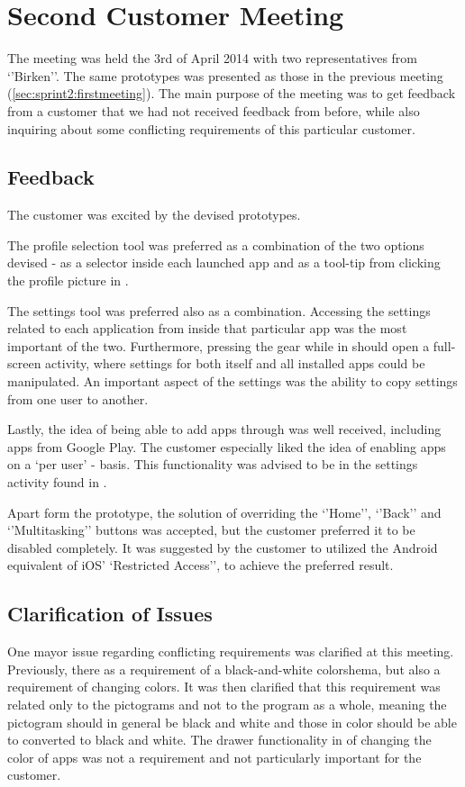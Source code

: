 \section{Second Customer Meeting}\label{sec:sprint2:secondmeeting}

The meeting was held the 3rd of April 2014 with two representatives from `'Birken''.
The same prototypes was presented as those in the previous meeting (\cref{sec:sprint2:firstmeeting}).
The main purpose of the meeting was to get feedback from a customer that we had not received feedback from before, while also inquiring about some conflicting requirements of this particular customer.

\subsection{Feedback}
The customer was excited by the devised prototypes.

The profile selection tool was preferred as a combination of the two options devised - as a selector inside each launched app and as a tool-tip from clicking the profile picture in \launcher.

The settings tool was preferred also as a combination.
Accessing the settings related to each application from inside that particular app was the most important of the two.
Furthermore, pressing the gear while in \launcher should open a full-screen activity, where settings for both \launcher itself and all installed apps could be manipulated.
An important aspect of the settings was the ability to copy settings from one user to another.

Lastly, the idea of being able to add apps through \launcher was well received, including apps from Google Play.
The customer especially liked the idea of enabling apps on a `per user' - basis.
This functionality was advised to be in the settings activity found in \launcher.

Apart form the prototype, the solution of overriding the `'Home'', `'Back'' and `'Multitasking'' buttons was accepted, but the customer preferred it to be disabled completely.
It was suggested by the customer to utilized the Android equivalent of iOS' `Restricted Access'', to achieve the preferred result.

\subsection{Clarification of Issues}
One mayor issue regarding conflicting requirements was clarified at this meeting.
Previously, there as a requirement of a black-and-white colorshema, but also a requirement of changing colors.
It was then clarified that this requirement was related only to the pictograms and not to the program as a whole, meaning the pictogram should in general be black and white and those in color should be able to converted to black and white.
The drawer functionality in \launcher of changing the color of apps was not a requirement and not particularly important for the customer.

